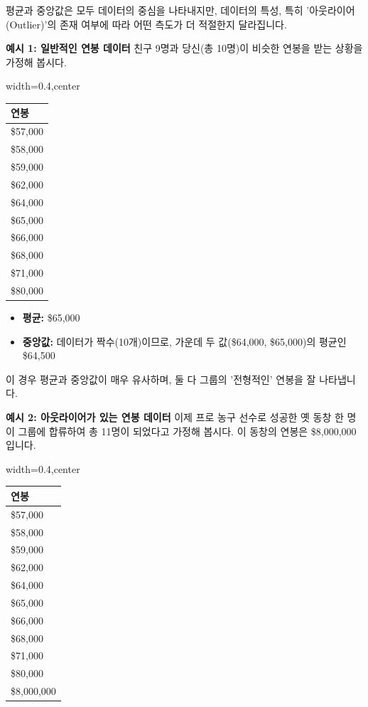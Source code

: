\documentclass[11pt,a4paper]{article}
\theoremstyle{definition}
\begin{document}
\begin{infobox}[title=어떤 중심 경향성 측도를 사용할 것인가? (평균 vs. 중앙값)]
평균과 중앙값은 모두 데이터의 중심을 나타내지만, 데이터의 특성, 특히 '아웃라이어(Outlier)'의 존재 여부에 따라 어떤 측도가 더 적절한지 달라집니다.

\textbf{예시 1: 일반적인 연봉 데이터}
친구 9명과 당신(총 10명)이 비슷한 연봉을 받는 상황을 가정해 봅시다.
\begin{adjustbox}{width=0.4\textwidth,center}
\begin{tabular}{l}
\toprule
\textbf{연봉} \\
\midrule
\$57,000 \\
\$58,000 \\
\$59,000 \\
\$62,000 \\
\$64,000 \\
\$65,000 \\
\$66,000 \\
\$68,000 \\
\$71,000 \\
\$80,000 \\
\bottomrule
\end{tabular}
\end{adjustbox}
\label{tab:salary_example1}

\begin{itemize}
    \item \textbf{평균:} \$65,000
    \item \textbf{중앙값:} 데이터가 짝수(10개)이므로, 가운데 두 값(\$64,000, \$65,000)의 평균인 \$64,500
\end{itemize}
이 경우 평균과 중앙값이 매우 유사하며, 둘 다 그룹의 '전형적인' 연봉을 잘 나타냅니다.

\textbf{예시 2: 아웃라이어가 있는 연봉 데이터}
이제 프로 농구 선수로 성공한 옛 동창 한 명이 그룹에 합류하여 총 11명이 되었다고 가정해 봅시다. 이 동창의 연봉은 \$8,000,000입니다.
\begin{adjustbox}{width=0.4\textwidth,center}
\begin{tabular}{l}
\toprule
\textbf{연봉} \\
\midrule
\$57,000 \\
\$58,000 \\
\$59,000 \\
\$62,000 \\
\$64,000 \\
\$65,000 \\
\$66,000 \\
\$68,000 \\
\$71,000 \\
\$80,000 \\
\$8,000,000 \\
\bottomrule
\end{tabular}
\end{adjustbox}
\label{tab:salary_example2}


\end{infobox}
\end{document}
